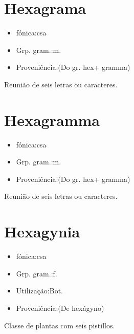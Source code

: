 \documentclass{article}
\begin{document}
\section{Hexagrama}
\begin{itemize}
\item {fónica:csa}
\end{itemize}
\begin{itemize}
\item {Grp. gram.:m.}
\end{itemize}
\begin{itemize}
\item {Proveniência:(Do gr. \textunderscore hex\textunderscore  + \textunderscore gramma\textunderscore )}
\end{itemize}
Reunião de seis letras ou caracteres.
\section{Hexagramma}
\begin{itemize}
\item {fónica:csa}
\end{itemize}
\begin{itemize}
\item {Grp. gram.:m.}
\end{itemize}
\begin{itemize}
\item {Proveniência:(Do gr. \textunderscore hex\textunderscore  + \textunderscore gramma\textunderscore )}
\end{itemize}
Reunião de seis letras ou caracteres.
\section{Hexagynia}
\begin{itemize}
\item {fónica:csa}
\end{itemize}
\begin{itemize}
\item {Grp. gram.:f.}
\end{itemize}
\begin{itemize}
\item {Utilização:Bot.}
\end{itemize}
\begin{itemize}
\item {Proveniência:(De \textunderscore hexágyno\textunderscore )}
\end{itemize}
Classe de plantas com seis pistillos.
\end{document}
